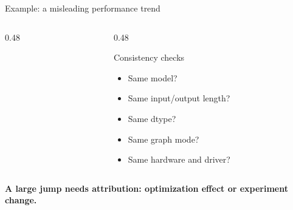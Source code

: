 \documentclass[aspectratio=169,11pt]{beamer}
\newcommand{\key}[1]{\textcolor{HUSTDeep}{\textbf{#1}}}
\begin{document}
\begin{frame}{Example: a misleading performance trend}
  \begin{columns}[T,totalwidth=\textwidth]
    \begin{column}{0.48\textwidth}
      \centering
    \end{column}
    \begin{column}{0.48\textwidth}
      \begin{block}{Consistency checks}
        \begin{itemize}
          \item Same model?
          \item Same input/output length?
          \item Same dtype?
          \item Same graph mode?
          \item Same hardware and driver?
        \end{itemize}
      \end{block}
    \end{column}
  \end{columns}
  \vspace{0.25cm}
  \key{A large jump needs attribution: optimization effect or experiment change.}
\end{frame}
\end{document}
